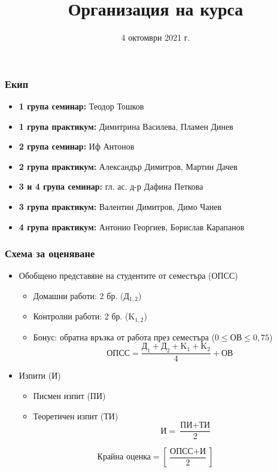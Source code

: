 \documentclass[alsotrans]{beamerswitch}
\title{Организация на курса}
\date{4 октомври 2021 г.}
\begin{document}
\begin{frame}
  \titlepage
\end{frame}

\begin{frame}
  \frametitle{Екип}

  \begin{itemize}
  \item \textbf{1 група семинар:} Теодор Тошков
  \item \textbf{1 група практикум:} Димитрина Василева, Пламен Динев
  \item \textbf{2 група семинар:} Иф Антонов
  \item \textbf{2 група практикум:} Александър Димитров, Мартин Дачев
  \item \textbf{3 и 4 група семинар:} гл. ас. д-р Дафина Петкова
  \item \textbf{3 група практикум:} Валентин Димитров, Димо Чанев
  \item \textbf{4 група практикум:} Антонио Георгиев, Борислав Карапанов
  \end{itemize}
\end{frame}

\begin{frame}
  \frametitle{Схема за оценяване}

  \begin{itemize}
  \item Обобщено представяне на студентите от семестъра (ОПСС)
    \begin{itemize}
    \item Домашни работи: 2 бр. (Д$_{1,2}$)
    \item Контролни работи: 2 бр. (K$_{1,2}$)
    \item Бонус: обратна връзка от работа през семестъра ($0 \leq \text{ОВ} \leq 0{,}75$)\\
      \begin{equation*}
        \text{ОПСС} = \frac{\text{Д}_1 + \text{Д}_2 + \text{K}_1 + \text{K}_2}4 + \text{ОВ} 
      \end{equation*}
    \end{itemize}
  \item Изпити (И)
    \begin{itemize}
    \item Писмен изпит (ПИ)
    \item Теоретичен изпит (ТИ)\\[-7.5ex]
      \begin{equation*}
        \qquad\qquad\text{И} = \frac{\text{ПИ} + \text{ТИ}}2
      \end{equation*}
    \end{itemize}
  \end{itemize}
  \vspace{2ex}
  \begin{equation*}
    \text{Крайна оценка} = \left[ \frac{\text{ОПСС} + \text{И}}2 \right]
  \end{equation*}
\end{frame}
\end{document}
